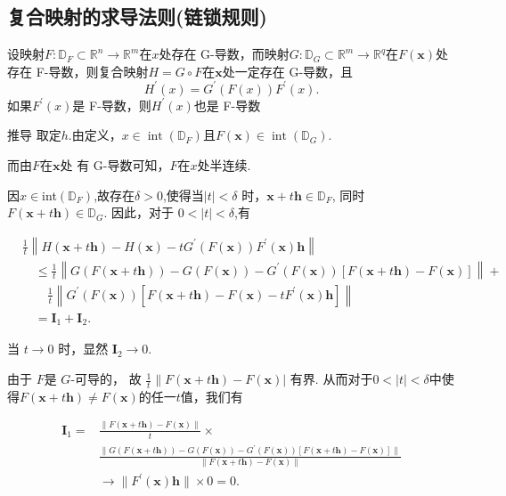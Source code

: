 \documentclass{lzureport}
\begin{document}
\subsection{复合映射的求导法则(链锁规则)}
 设映射$F:\mathbb{D}_F\subset\mathbb{R}^n\to\mathbb{R}^m$在$x$处存在 G-导数，而映射$G:\mathbb{D}_G\subset\mathbb{R}^m\to\mathbb{R}^q$在$F(\boldsymbol{x})$处存在 F-导数，则复合映射$H=G\circ F$在$\boldsymbol{x}$处一定存在 G-导数，且
$$H^{\prime}(x)=G^{\prime}(F(x))F^{\prime}(x).$$
如果$F^\prime(x)$是 F-导数，则$H^\prime(x)$也是 F-导数

\begin{derivation}{推导}
	取定$h.$由定义，$x\in\operatorname{int}\left(\mathbb{D}_F\right)$且$F(\boldsymbol{x})\in\operatorname{int}\left(\mathbb{D}_G\right).$
	
	而由$F$在$\boldsymbol{x}$处
有 G-导数可知，$F$在$x$处半连续.

	因$x\in$int$(\mathbb{D}_F)$,故存在$\delta>0$,使得当$|t|<\delta$ 时，$\boldsymbol x+t\boldsymbol{h}\in\mathbb{D}_F$, 同时 $F(\boldsymbol x+t\boldsymbol{h})\in\mathbb{D}_G.$ 因此，对于 $0<|t|<\delta$,有

$$
\begin{aligned}
	&\frac1t\left\|H(\boldsymbol{x}+t\boldsymbol{h})-H(\boldsymbol{x})-tG^{\prime}(F(\boldsymbol{x}))F^{\prime}(\boldsymbol{x})\boldsymbol{h}\right\|\\
	&\quad \leqslant\frac1t\left\|G(F(\boldsymbol{x}+t\boldsymbol{h}))-G(F(\boldsymbol{x}))-G^{\prime}(F(\boldsymbol{x}))[F(\boldsymbol{x}+t\boldsymbol{h})-F(\boldsymbol{x})]\right\|+\\
	&\qquad \frac1t\left\|G^{\prime}(F(\boldsymbol{x}))\left[F(\boldsymbol{x}+t\boldsymbol{h})-F(\boldsymbol{x})-tF^{\prime}(\boldsymbol{x})\boldsymbol{h}\right]\right\|\\
	&\quad=\boldsymbol{I}_1+\boldsymbol{I}_2.
\end{aligned}
$$


当 $t\to0$ 时，显然 $\boldsymbol{I}_{2}\to0.$ 

由于 $F$是 $G$-可导的，
故 $\frac{1}{t}\|F(\boldsymbol{x}+t\boldsymbol{h})-F(\boldsymbol{x})|$ 有界. 从而对于$0<|t|<\delta$中使得$F(\boldsymbol{x}+t\boldsymbol{h})\neq F(\boldsymbol{x})$的任一$t$值，我们有

$$
\begin{aligned}
	\boldsymbol{I}_1=& \frac{\left\|F(\boldsymbol{x}+t\boldsymbol{h})-F(\boldsymbol{x})\right\|}t\times   \\
	&\frac{\|G(F(\boldsymbol{x}+t\boldsymbol{h}))-G(F(\boldsymbol{x}))-G^{\prime}(F(\boldsymbol{x}))[F(\boldsymbol{x}+t\boldsymbol{h})-F(\boldsymbol{x})]\|}{\|F(\boldsymbol{x}+t\boldsymbol{h})-F(\boldsymbol{x})\|}  \\
	&\to \|F^{\prime}(\boldsymbol{x})\boldsymbol{h}\|\times0=0.
\end{aligned}
$$

\end{derivation}
\end{document}
